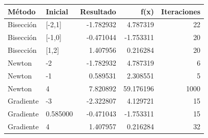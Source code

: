 \begin{tabular}{llrrr}
\toprule
Método & Inicial & Resultado & f(x) & Iteraciones \\
\midrule
Bisección & [-2,1] & -1.782932 & 4.787319 & 22 \\
Bisección & [-1,0] & -0.471044 & -1.753311 & 20 \\
Bisección & [1,2] & 1.407956 & 0.216284 & 20 \\
Newton & -2 & -1.782932 & 4.787319 & 6 \\
Newton & -1 & 0.589531 & 2.308551 & 5 \\
Newton & 4 & 7.820892 & 59.176196 & 1000 \\
Gradiente & -3 & -2.322807 & 4.129721 & 15 \\
Gradiente & 0.585000 & -0.471043 & -1.753311 & 15 \\
Gradiente & 4 & 1.407957 & 0.216284 & 32 \\
\bottomrule
\end{tabular}
